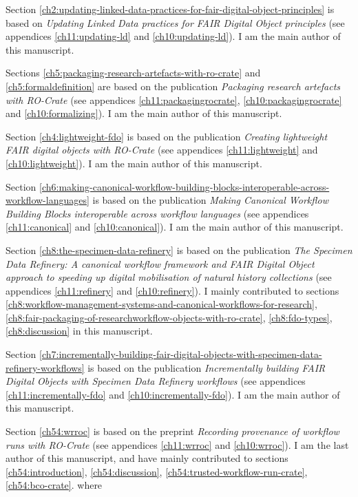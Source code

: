 Section \ref{ch2:updating-linked-data-practices-for-fair-digital-object-principles} is based on \emph{Updating Linked Data practices for FAIR Digital Object principles} \cite{10.3897/rio.8.e94501} (see appendices \ref{ch11:updating-ld} and \ref{ch10:updating-ld}). I am the main author of this manuscript.

Sections \ref{ch5:packaging-research-artefacts-with-ro-crate} and \vref{ch5:formaldefinition} are based on the publication \emph{Packaging research artefacts with RO-Crate} \cite{Soiland-Reyes 2022} (see appendices \ref{ch11:packagingrocrate}, \ref{ch10:packagingrocrate} and \ref{ch10:formalizing}). I am the main author of this manuscript.

Section \ref{ch4:lightweight-fdo} is based on the publication \emph{Creating lightweight FAIR digital objects with RO-Crate} \cite{10.3897/rio.8.e93937} (see appendices \ref{ch11:lightweight} and \ref{ch10:lightweight}). I am the main author of this manuscript.

Section \ref{ch6:making-canonical-workflow-building-blocks-interoperable-across-workflow-languages} is based on the publication \emph{Making Canonical Workflow Building Blocks interoperable across workflow languages} \cite{Soiland-Reyes 2022b} (see appendices \ref{ch11:canonical} and \ref{ch10:canonical}). I am the main author of this manuscript.

Section \ref{ch8:the-specimen-data-refinery} is based on the publication \emph{The Specimen Data Refinery: A
canonical workflow framework and FAIR Digital Object approach to speeding up digital mobilisation of natural history collections} \cite{Hardisty 2022} (see appendices \ref{ch11:refinery} and \ref{ch10:refinery}). I mainly contributed to sections \ref{ch8:workflow-management-systems-and-canonical-workflows-for-research}, \ref{ch8:fair-packaging-of-researchworkflow-objects-with-ro-crate}, \ref{ch8:fdo-types}, \ref{ch8:discussion} in this manuscript.

Section \ref{ch7:incrementally-building-fair-digital-objects-with-specimen-data-refinery-workflows} is based on the publication \emph{Incrementally building FAIR Digital Objects with Specimen Data
Refinery workflows} \cite{Woolland 2022} (see appendices \ref{ch11:incrementally-fdo} and \ref{ch10:incrementally-fdo}). I am the main author of this manuscript.

Section \ref{ch54:wrroc} is based on the preprint \emph{
Recording provenance of workflow runs with RO-Crate} \cite{workflow-run-crate} (see appendices \ref{ch11:wrroc} and \ref{ch10:wrroc}). I am the last author of this manuscript, and have mainly contributed to sections \ref{ch54:introduction}, \ref{ch54:discussion}, \ref{ch54:trusted-workflow-run-crate}, \ref{ch54:bco-crate}.
where